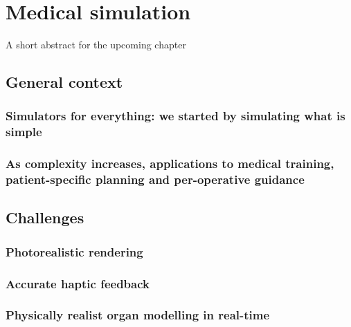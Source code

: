 \chapter{Medical simulation}
\label{chap1}
\begin{shortAbstract}
A short abstract for the upcoming chapter
\end{shortAbstract}


\section{General context}
	\subsection{Simulators for everything: we started by simulating what is simple}
	\subsection{As complexity increases, applications to medical training, patient-specific planning and per-operative guidance}
		
\section{Challenges}					
	\subsection{Photorealistic rendering}
	\subsection{Accurate haptic feedback}
	\subsection{Physically realist organ modelling in real-time}